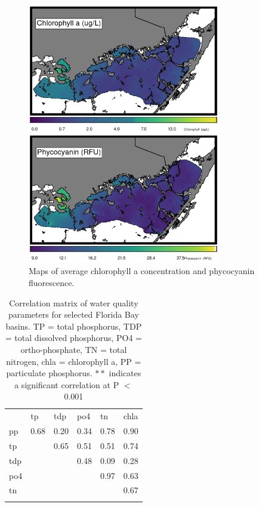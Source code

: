 \begin{figure}
  \centering
  \includegraphics[width=0.75\textwidth]{../../figures/avmap.png}
  \caption{Maps of average chlorophyll a concentration and phycocyanin fluorescence.}
  \label{fig:6}
\end{figure}

%
\begin{table}
\caption{Correlation matrix of water quality parameters for selected Florida Bay basins. TP = total phosphorus, TDP = total dissolved phosphorus, PO4 = ortho-phosphate, TN = total nitrogen, chla = chlorophyll a, PP = particulate phosphorus. $**$ indicates a significant correlation at P $<$ 0.001}
\label{tab:1}       %
\begin{tabular}{llllll}
\hline\noalign{\smallskip}
& tp & tdp & po4 & tn & chla \\
\noalign{\smallskip}\hline\noalign{\smallskip}
pp & 0.68 & 0.20 & 0.34 & 0.78 & 0.90 \\ 
tp  &  & 0.65 & 0.51 & 0.51 & 0.74 \\ 
tdp  &  &  & 0.48 & 0.09 & 0.28 \\ 
po4  &  &  &  & 0.97 & 0.63 \\ 
tn  &  &  &  &  & 0.67 \\ 
\noalign{\smallskip}\hline
\end{tabular}
\end{table}

